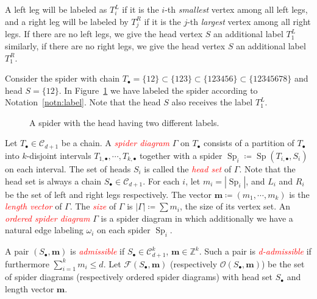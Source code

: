 \documentclass[ALCO,ThmDefs,Unicode,epreuves]{cedram}
\newcommand{\bm}[1]{{\boldsymbol{#1}}}
\newcommand\m{\bm{m}}
\newcommand{\important}[1]{\emph{\textcolor{red}{#1}}}
\DeclareMathOperator{\Sp}{Sp}
\newcommand{\D}{{\Gamma}}
\newcommand{\spd}{\mathcal F}
\newcommand{\lspd}{\mathcal O}
\newcommand{\CC}{\mathcal{C}}
\newcommand{\ZZ}{\mathbb{Z}}
\begin{document}
\begin{nota}\label{notn:label}
	A left leg will be labeled as $T_i^L$ if it is the $i$-th \emph{smallest} vertex among all left legs, and a right leg will be labeled by $T_j^R$ if it is the $j$-th \emph{largest} vertex among all right legs.
	If there are no left legs, we give the head vertex $S$ an additional label $T^L_1$ similarly, if there are no right legs, we give the head vertex $S$ an additional label $T^R_1$. 	
\end{nota}

\begin{exam}
	
	Consider the spider with chain $T_\bullet = \{12\}\subset \{123\}\subset \{123456\}\subset \{12345678\}$ and head $S=\{12\}$. In Figure~\ref{fig:singlespider} we have labeled the spider according to Notation~\ref{notn:label}. Note that the head $S$ also receives the label $T^L_1$.

	\begin{figure}[ht]
		
		\caption{A spider with the head having two different labels.}
		\label{fig:singlespider}
	\end{figure}

\end{exam}

\begin{defi}\label{def:sd}
	Let $T_\bullet\in\CC_{d+1}$ be a chain. A \important{spider diagram} $\D$ on $T_\bullet$ consists of a partition of $T_\bullet$ into $k$-disjoint intervals $T_{1,\bullet},\cdots,T_{k,\bullet}$ together with a spider $\Sp_i\coloneqq \Sp(T_{i,\bullet},S_i)$ on each interval. The set of heads $S_i$ is called the \important{head set} of $\D$. Note that the head set is always a chain $S_\bullet\in\CC_{d+1}$. For each $i$, let $m_i=|\Sp_i|$, and $L_i$ and $R_i$ be the set of left and right legs respectively. The vector $\m\coloneqq (m_1,\cdots,m_k)$ is the \important{length vector} of $\D$. The \important{size} of $\D$ is $|\D|\coloneqq \sum m_i$, the size of its vertex set. An \important{ordered spider diagram} $\D$ is a spider diagram in which additionally we have a natural edge labeling $\omega_i$ on each spider $\Sp_i$. 
	
	A pair $(S_\bullet,\m)$ is \important{admissible} if $S_\bullet\in\CC^k_{d+1}$, $\m\in\ZZ^k$. Such a pair is \important{d-admissible} if furthermore $\sum_{i=1}^k{m_i}\leq d$. 
	Let $\spd(S_\bullet,\m)$ (respectively $\lspd(S_\bullet,\m)$) be the set of spider diagrams (respectively ordered spider diagrams) with head set $S_\bullet$ and length vector $\m$.
\end{defi}
\end{document}
